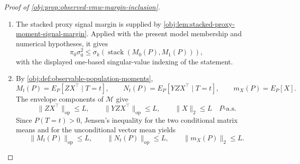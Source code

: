 \begin{proof}[Proof of \cref{obj:prop:observed-vmw-margin-inclusion}]
\begin{enumerate}
\item The stacked proxy signal margin is supplied by
\cref{obj:lem:stacked-proxy-moment-signal-margin}.  Applied with the present model membership and numerical hypotheses, it gives
\[
\pi_0\sigma_0^2
\le
\sigma_k\!\left(\operatorname{stack}(M_0(P),M_1(P))\right),
\]
with the displayed one-based singular-value indexing of the statement.

\item By \cref{obj:def:observable-population-moments},
\[
M_t(P)=E_P[ZX^\top\mid T=t],
\qquad
N_t(P)=E_P[YZX^\top\mid T=t],
\qquad
m_X(P)=E_P[X].
\]
The envelope components of \(\mathcal M\) give
\[
\|ZX^\top\|_{\mathrm{op}}\le L,
\qquad
\|YZX^\top\|_{\mathrm{op}}\le L,
\qquad
\|X\|_2\le L
\quad P\text{-a.s.}
\]
Since \(P(T=t)>0\), Jensen's inequality for the two conditional matrix means and for the unconditional vector mean yields
\[
\|M_t(P)\|_{\mathrm{op}}\le L,
\qquad
\|N_t(P)\|_{\mathrm{op}}\le L,
\qquad
\|m_X(P)\|_2\le L .
\]


\end{enumerate}
\end{proof}

